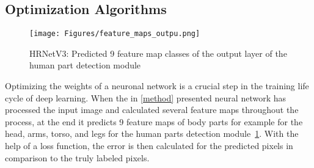 \subsection{Optimization Algorithms}
\label{opt}
\begin{figure}[H]
    \centering
    \texttt{[image: Figures/feature\_maps\_outpu.png]}
    \decoRule
    \caption[HRNetV3: Prediceted Feature Maps]{HRNetV3: Predicted 9 feature map classes of the output layer of the
    human part detection module}
    \label{fig:feature-maps-output}
\end{figure}
Optimizing the weights of a neuronal network is a crucial step in the training life cycle of deep learning.
When the in \autoref{method} presented neural network has processed the input image and calculated several feature maps throughout the process,
at the end it predicts 9 feature maps of body parts for example for the head, arms, torso, and legs for the human parts
detection module~\ref{fig:feature-maps-output}.
With the help of a loss function, the error is then calculated for the predicted pixels in comparison to the truly labeled
pixels.
